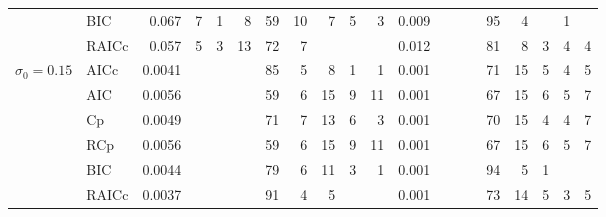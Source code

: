 \documentclass[11pt]{article}
\begin{document}
{\begin{table}[!ht]
\begin{tabular}{clrrrrrrrrr|rrrrrrrrr}
      & BIC   & 0.067 & 7     & 1     & 8     & 59    & 10    & 7     & 5     & 3     & 0.009 &       &       &       & 95    & 4     &       & 1     &  \\
      & RAICc & 0.057 & 5     & 3     & 13    & 72    & 7     &       &       &       & 0.012 &       &       &       & 81    & 8     & 3     & 4     & 4 \\
\midrule
\multirow{6}[1]{*}{$\sigma_0=0.15$} & AICc  & 0.0041 &       &       &       & 85    & 5     & 8     & 1     & 1     & 0.001 &       &       &       & 71    & 15    & 5     & 4     & 5 \\
      & AIC   & 0.0056 &       &       &       & 59    & 6     & 15    & 9     & 11    & 0.001 &       &       &       & 67    & 15    & 6     & 5     & 7 \\
      & Cp    & 0.0049 &       &       &       & 71    & 7     & 13    & 6     & 3     & 0.001 &       &       &       & 70    & 15    & 4     & 4     & 7 \\
      & RCp   & 0.0056 &       &       &       & 59    & 6     & 15    & 9     & 11    & 0.001 &       &       &       & 67    & 15    & 6     & 5     & 7 \\
      & BIC   & 0.0044 &       &       &       & 79    & 6     & 11    & 3     & 1     & 0.001 &       &       &       & 94    & 5     & 1     &       &  \\
      & RAICc & 0.0037 &       &       &       & 91    & 4     & 5     &       &       & 0.001 &       &       &       & 73    & 14    & 5     & 3     & 5 \\
\end{tabular}%


\end{table}


}
\end{document}
